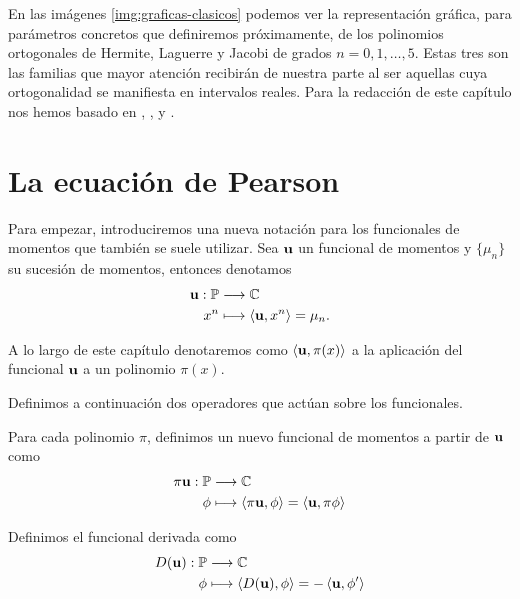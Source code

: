 En las imágenes \ref{img:graficas-clasicos} podemos ver la representación gráfica, para parámetros concretos que definiremos próximamente, de los polinomios ortogonales de Hermite, Laguerre y Jacobi de grados $n=0,1,\dots,5$. Estas tres son las familias que mayor atención recibirán de nuestra parte al ser aquellas cuya ortogonalidad se manifiesta en intervalos reales. Para la redacción de este capítulo nos hemos basado en \cite{Marcellán1994}, \cite[Ch. III]{renato}, \cite[Ch. XII, Section 12.1]{ARFKEN2013551} y \cite[Ch. I, Section 1.4]{dunkl-2014}.

\section{La ecuación de Pearson}

Para empezar, introduciremos una nueva notación para los funcionales de momentos que también se suele utilizar. Sea $\mathbf{u}$ un funcional de momentos y $\{\mu_n\}$ su sucesión de momentos, entonces denotamos
\begin{equation}
    \label{eq:nueva-notacion-funcional}
    \begin{split}
        \mathbf{u}:\mathbb P & \longrightarrow \mathbb{C} \\
        x^n & \longmapsto \left\langle \mathbf{u}, x^n \right\rangle = \mu_n.
    \end{split}
\end{equation}

A lo largo de este capítulo denotaremos como $\left\langle \mathbf{u} , \pi(x) \right\rangle$ a la aplicación del funcional $\mathbf{u}$ a un polinomio $\pi(x)$.

Definimos a continuación dos operadores que actúan sobre los funcionales.

\begin{definicion}
    Para cada polinomio $\pi$, definimos un nuevo funcional de momentos a partir de $\mathbf{u}$ como
    \begin{equation}
        \begin{split}
            \pi\mathbf{u}:\mathbb P & \longrightarrow \mathbb{C} \\
            \phi & \longmapsto \left\langle \pi\mathbf{u} , \phi \right\rangle=\left\langle \mathbf{u} , \pi\phi \right\rangle
        \end{split}
    \end{equation}
    
\end{definicion}

\begin{definicion}[Derivada]
    Definimos el funcional derivada como
    \begin{equation}
        \begin{split}
            D(\mathbf{u}):\mathbb P & \longrightarrow \mathbb{C} \\
            \phi & \longmapsto \left\langle D(\mathbf{u}) , \phi \right\rangle=-\left\langle \mathbf{u} , \phi' \right\rangle
        \end{split}
    \end{equation}
    
\end{definicion}

